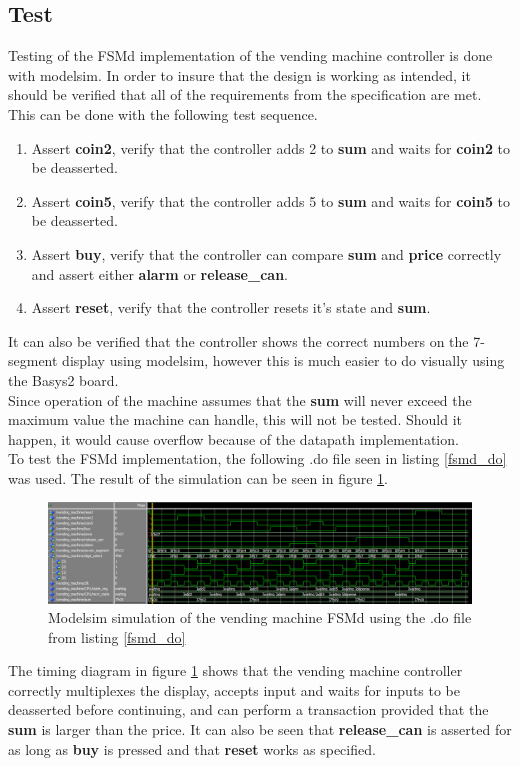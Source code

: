 \subsection{Test}
Testing of the FSMd implementation of the vending machine controller is done with modelsim.
In order to insure that the design is working as intended, it should be verified that
all of the requirements from the specification are met. 
This can be done with the following test sequence.
\begin{enumerate}
    \item Assert \textbf{coin2}, verify that the controller adds 2 to \textbf{sum} and waits for \textbf{coin2} to be deasserted.
    \item Assert \textbf{coin5}, verify that the controller adds 5 to \textbf{sum} and waits for \textbf{coin5} to be deasserted.
    \item Assert \textbf{buy}, verify that the controller can compare \textbf{sum} and \textbf{price} correctly and assert either \textbf{alarm} or \textbf{release\_can}.
    \item Assert \textbf{reset}, verify that the controller resets it's state and \textbf{sum}.
\end{enumerate}
It can also be verified that the controller shows the correct numbers on the 7-segment display using modelsim, however this is much easier to do 
visually using the Basys2 board. \\

Since operation of the machine assumes that the \textbf{sum} will never exceed the maximum value the machine can handle, this will not be tested.
Should it happen, it would cause overflow because of the datapath implementation. \\

To test the FSMd implementation, the following .do file seen in listing \ref{fsmd_do} was used. The result of the simulation can be seen 
in figure \ref{fsmd_sim}.



\begin{figure}
    \center
    \includegraphics[width=1\textwidth]{pictures/FSMd_test.png}
    \caption{Modelsim simulation of the vending machine FSMd using the .do file from listing \ref{fsmd_do} }
    \label{fsmd_sim}
\end{figure}

The timing diagram in figure \ref{fsmd_sim} shows that the vending machine controller correctly multiplexes the display,
accepts input and waits for inputs to be deasserted before continuing, and can perform a transaction provided that
the \textbf{sum} is larger than the price. It can also be seen that \textbf{release\_can} is asserted for as long
as \textbf{buy} is pressed and that \textbf{reset} works as specified.
